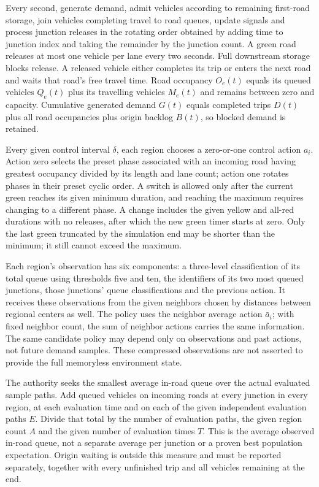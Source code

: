 \documentclass[10pt]{article}
\begin{document}
Every second, generate demand, admit vehicles according to remaining first-road storage, join vehicles completing travel to road queues, update signals and process junction releases in the rotating order obtained by adding time to junction index and taking the remainder by the junction count. A green road releases at most one vehicle per lane every two seconds. Full downstream storage blocks release. A released vehicle either completes its trip or enters the next road and waits that road's free travel time. Road occupancy $O_e(t)$ equals its queued vehicles $Q_e(t)$ plus its travelling vehicles $M_e(t)$ and remains between zero and capacity. Cumulative generated demand $G(t)$ equals completed trips $D(t)$ plus all road occupancies plus origin backlog $B(t)$, so blocked demand is retained.

Every given control interval $\delta$, each region chooses a zero-or-one control action $a_i$. Action zero selects the preset phase associated with an incoming road having greatest occupancy divided by its length and lane count; action one rotates phases in their preset cyclic order. A switch is allowed only after the current green reaches its given minimum duration, and reaching the maximum requires changing to a different phase. A change includes the given yellow and all-red durations with no releases, after which the new green timer starts at zero. Only the last green truncated by the simulation end may be shorter than the minimum; it still cannot exceed the maximum.

Each region's observation has six components: a three-level classification of its total queue using thresholds five and ten, the identifiers of its two most queued junctions, those junctions' queue classifications and the previous action. It receives these observations from the given neighbors chosen by distances between regional centers as well. The policy uses the neighbor average action $\bar a_i$; with fixed neighbor count, the sum of neighbor actions carries the same information. The same candidate policy may depend only on observations and past actions, not future demand samples. These compressed observations are not asserted to provide the full memoryless environment state.

The authority seeks the smallest average in-road queue over the actual evaluated sample paths. Add queued vehicles on incoming roads at every junction in every region, at each evaluation time and on each of the given independent evaluation paths $E$. Divide that total by the number of evaluation paths, the given region count $A$ and the given number of evaluation times $T$. This is the average observed in-road queue, not a separate average per junction or a proven best population expectation. Origin waiting is outside this measure and must be reported separately, together with every unfinished trip and all vehicles remaining at the end.
\end{document}
